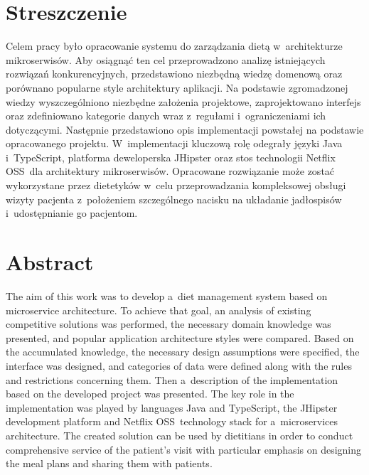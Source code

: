 \chapter*{Streszczenie} %
Celem pracy było opracowanie systemu do zarządzania dietą w~architekturze mikroserwisów.
Aby osiągnąć ten cel przeprowadzono analizę istniejących rozwiązań konkurencyjnych,
przedstawiono niezbędną wiedzę domenową oraz porównano popularne style architektury aplikacji.
Na podstawie zgromadzonej wiedzy wyszczególniono niezbędne założenia projektowe, zaprojektowano interfejs
oraz zdefiniowano kategorie danych wraz z~regułami i~ograniczeniami ich dotyczącymi.
Następnie przedstawiono opis implementacji powstałej na podstawie opracowanego projektu.
W~implementacji kluczową rolę odegrały języki Java i~TypeScript, platforma deweloperska JHipster
oraz stos technologii Netflix OSS~dla architektury mikroserwisów.
Opracowane rozwiązanie może zostać wykorzystane przez dietetyków w~celu przeprowadzania kompleksowej obsługi wizyty pacjenta
z~położeniem szczególnego nacisku na układanie jadłospisów i~udostępnianie go pacjentom.


\begingroup
\renewcommand{\cleardoublepage}{}
\renewcommand{\clearpage}{}
\chapter*{Abstract} %
The aim of this work was to develop a~diet management system based on microservice architecture.
To achieve that goal, an analysis of existing competitive solutions was performed, the necessary domain knowledge was presented,
and popular application architecture styles were compared.
Based on the accumulated knowledge, the necessary design assumptions were specified, the interface was designed,
and categories of data were defined along with the rules and restrictions concerning them.
Then a~description of the implementation based on the developed project was presented.
The key role in the implementation was played by languages Java and TypeScript,
the JHipster development platform and Netflix OSS~technology stack for a~microservices architecture.
The created solution can be used by dietitians in order to conduct comprehensive service of the patient's visit
with particular emphasis on designing the meal plans and sharing them with patients.
\endgroup
{}
